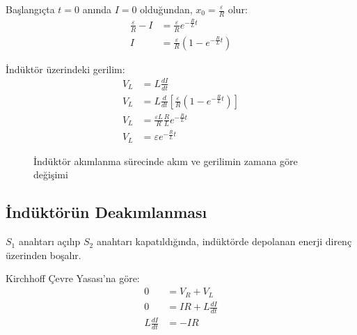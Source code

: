 \documentclass[11pt,letterpaper,twocolumn]{fenbil}
\begin{document}
Başlangıçta $t = 0$ anında $I = 0$ olduğundan, $x_0 = \frac{\varepsilon}{R}$ olur:
\begin{align}
\frac{\varepsilon}{R} - I &= \frac{\varepsilon}{R}e^{-\frac{R}{L}t}\\
I &= \frac{\varepsilon}{R}(1 - e^{-\frac{R}{L}t})
\end{align}

İndüktör üzerindeki gerilim:
\begin{align}
V_L &= L\frac{dI}{dt}\\
V_L &= L\frac{d}{dt}\left[\frac{\varepsilon}{R}(1 - e^{-\frac{R}{L}t})\right]\\
V_L &= \frac{\varepsilon L}{R}\frac{R}{L}e^{-\frac{R}{L}t}\\
V_L &= \varepsilon e^{-\frac{R}{L}t}
\end{align}

\begin{figure}[h]
\centering
{}
\caption{İndüktör akımlanma sürecinde akım ve gerilimin zamana göre değişimi}
\end{figure}

\subsection{İndüktörün Deakımlanması}

$S_1$ anahtarı açılıp $S_2$ anahtarı kapatıldığında, indüktörde depolanan enerji direnç üzerinden boşalır.

Kirchhoff Çevre Yasası'na göre:
\begin{align}
0 &= V_R + V_L\\
0 &= IR + L\frac{dI}{dt}\\
L\frac{dI}{dt} &= -IR
\end{align}
\end{document}
